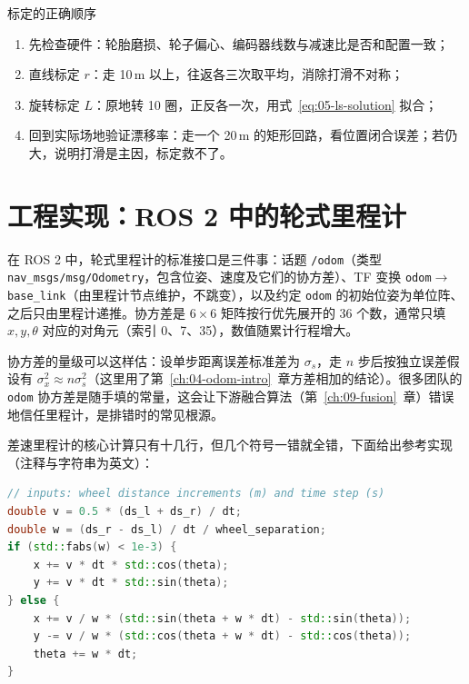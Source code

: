 \begin{keybox}{标定的正确顺序}
\begin{enumerate}
  \item 先检查硬件：轮胎磨损、轮子偏心、编码器线数与减速比是否和配置一致；
  \item 直线标定 $r$：走 10\,m 以上，往返各三次取平均，消除打滑不对称；
  \item 旋转标定 $L$：原地转 10 圈，正反各一次，用式~\eqref{eq:05-ls-solution} 拟合；
  \item 回到实际场地验证漂移率：走一个 20\,m 的矩形回路，看位置闭合误差；若仍大，说明打滑是主因，标定救不了。
\end{enumerate}
\end{keybox}

\section{工程实现：ROS 2 中的轮式里程计}\label{sec:05-engineering}

在 ROS 2 中，轮式里程计的标准接口是三件事：话题 \texttt{/odom}（类型 \texttt{nav\_msgs/msg/Odometry}，包含位姿、速度及它们的协方差）、TF 变换 \texttt{odom}$\to$\texttt{base\_link}（由里程计节点维护，不跳变），以及约定 \texttt{odom} 的初始位姿为单位阵、之后只由里程计递推。协方差是 $6\times6$ 矩阵按行优先展开的 36 个数，通常只填 $x,y,\theta$ 对应的对角元（索引 0、7、35），数值随累计行程增大。

协方差的量级可以这样估：设单步距离误差标准差为 $\sigma_s$，走 $n$ 步后按独立误差假设有 $\sigma_x^{2}\approx n\sigma_s^{2}$（这里用了第~\ref{ch:04-odom-intro}~章方差相加的结论）。很多团队的 \texttt{odom} 协方差是随手填的常量，这会让下游融合算法（第~\ref{ch:09-fusion}~章）错误地信任里程计，是排错时的常见根源。

差速里程计的核心计算只有十几行，但几个符号一错就全错，下面给出参考实现（注释与字符串为英文）：

\begin{lstlisting}[language=C++, caption={差速里程计核心计算（节选）}, label={lst:05-core}]
// inputs: wheel distance increments (m) and time step (s)
double v = 0.5 * (ds_l + ds_r) / dt;
double w = (ds_r - ds_l) / dt / wheel_separation;
if (std::fabs(w) < 1e-3) {
    x += v * dt * std::cos(theta);
    y += v * dt * std::sin(theta);
} else {
    x += v / w * (std::sin(theta + w * dt) - std::sin(theta));
    y -= v / w * (std::cos(theta + w * dt) - std::cos(theta));
    theta += w * dt;
}
\end{lstlisting}

